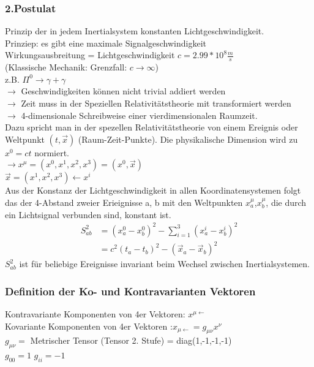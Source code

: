 \documentclass[a4paper]{article}
\begin{document}
\subsubsection{2.Postulat}
Prinzip der in jedem Inertialsystem konstanten Lichtgeschwindigkeit.\\
Prinziep: es gibt eine maximale Signalgeschwindigkeit\\
Wirkungsausbreitung = Lichtgeschwindigkeit $c=2.99*10^8\frac{m}{s}$\\
(Klassische Mechanik: Grenzfall: $c \rightarrow \infty$)\\
z.B. $\Pi^0 \rightarrow \gamma + \gamma$\\
$\rightarrow$ Geschwindigkeiten können nicht trivial addiert werden\\
$\rightarrow$ Zeit muss in der Speziellen Relativitätstheorie mit transformiert
werden\\
$\rightarrow$ 4-dimensionale Schreibweise einer vierdimensionalen Raumzeit.\\
Dazu spricht man in der spezellen Relativitätstheorie von einem Ereignis oder
Weltpunkt $(t,\vec{x})$ (Raum-Zeit-Punkte). Die physikalische Dimension wird zu
$x^0=ct$ normiert.\\
$\rightarrow x^{\mu}=(x^0,x^1,x^2,x^3)=(x^0,\vec{x})$\\
$\vec{x}=(x^1,x^2,x^3)\leftarrow x^i$\\
Aus der Konstanz der Lichtgeschwindigkeit in allen Koordinatensystemen folgt
das der 4-Abstand zweier Erieignisse a, b mit den Weltpunkten
$x^{\mu}_a$,$x^{\mu}_b$, die durch ein Lichtsignal verbunden sind, konstant
ist.
\begin{align}
S^2_{ab}&=(x^0_a-x^0_b)^2-\sum_{i=1}^3(x^i_a-x^i_b)^2 \\
&=c^2(t_a-t_b)^2-(\vec{x}_a-\vec{x}_b)^2
\end{align}
$S^2_{ab}$ ist für beliebige Ereignisse invariant beim Wechsel zwischen
Inertialsystemen.
\subsubsection{Definition der Ko- und Kontravarianten Vektoren}
Kontravariante Komponenten von 4er Vektoren: $x^{\mu \leftarrow}$\\ 
Kovariante Komponenten von 4er Vektoren :$x_{\mu \leftarrow}=g_{\mu
\nu}x^{\nu}$\\
$g_{\mu \nu} =$ Metrischer Tensor (Tensor 2. Stufe)
	     = diag(1,-1,-1,-1)\\
		  $g_{00}=1$ $g_{ii}=-1$\\
		  
\end{document}
